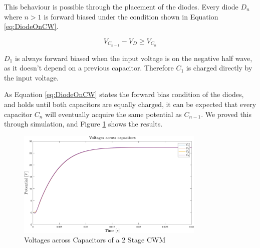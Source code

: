 This behaviour is possible through the placement of the diodes.
Every diode $D_n$ where $n > 1$ is forward biased under the condition shown in Equation \ref{eq:DiodeOnCW}.

\begin{equation}
	V_{C_{n-1}}-V_D \geq V_{C_n}
	\label{eq:DiodeOnCW}
\end{equation}

$D_1$ is always forward biased when the input voltage is on the negative half wave,
as it doesn't depend on a previous capacitor.
Therefore $C_1$ is charged directly by the input voltage.

As Equation \ref{eq:DiodeOnCW} states the forward bias condition of the diodes,
and holds until both capacitors are equally charged,
it can be expected that every capacitor $C_n$ will eventually acquire the same potential as $C_{n-1}$.
We proved this through simulation,
and Figure \ref{fig:capsV} shows the results.


\begin{figure}[H]
   \centering
   \includegraphics[width=0.8\textwidth]{figures/xCockroftWalton/capsV.pdf}
    \caption{Voltages across Capacitors of a 2 Stage CWM}
	\label{fig:capsV}
\end{figure}
